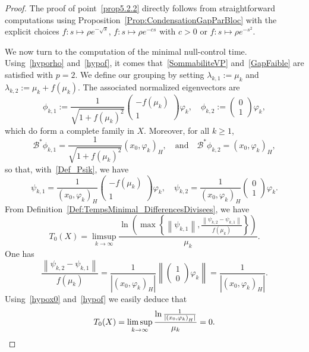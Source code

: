 \documentclass[AHL,Unicode,longabstracts]{cedram}
\newcommand\Bs{\mathcal{B}^*}
\newcommand{\normeX}[1]{\left\| #1 \right\|}
\newcommand{\psH}[2]{\left(#1, #2 \right)_H}
\begin{document}
\begin{proof}
The proof of point~\eqref{prop5.2.2} directly follows from straightforward computations using Proposition~\ref{Prop:CondensationGapParBloc} with the explicit choices $f : s \mapsto \rho e^{-\sqrt{s}}$, $ f : s \mapsto \rho e^{-cs}$ with $c >0$ or $f : s \mapsto \rho e^{-s^2}$.

We now turn to the computation of the minimal null-control time. Using~\eqref{hyporho} and~\eqref{hypof}, it comes that~\eqref{SommabiliteVP} and~\eqref{GapFaible} are satisfied with $p=2$. We define our grouping by setting $\lambda_{k,1}:=\mu_k$ and $\lambda_{k,2}:=\mu_k+f(\mu_k)$. The associated normalized eigenvectors are
\[
\phi_{k,1} := \frac{1}{\sqrt{1+f(\mu_k)^2}}
\begin{pmatrix} -f(\mu_k) \\ 1
\end{pmatrix} \varphi_k,
\quad
\phi_{k,2} :=
\begin{pmatrix} 0 \\ 1
\end{pmatrix} \varphi_k,
\]
which do form a complete family in $X$. Moreover, for all $k \geq 1$,
\[
\Bs \phi_{k,1}= \frac{1}{\sqrt{1+f(\mu_k)^2}} \psH{x_0}{\varphi_k},
\quad \text{and} \quad
\Bs \phi_{k,2}= \psH{x_0}{\varphi_k},
\]
so that, with~\eqref{Def_Psik}, we have
\[
\psi_{k,1} = \frac{1}{\psH{x_0}{\varphi_k}}
\begin{pmatrix} -f(\mu_k) \\ 1
\end{pmatrix} \varphi_k,
\quad
\psi_{k,2} = \frac{1}{\psH{x_0}{\varphi_k}}
\begin{pmatrix} 0 \\ 1
\end{pmatrix} \varphi_k.
\]
From Definition~\eqref{Def:TempsMinimal_DifferencesDivisees}, we have
\[
T_0(X) = \limsup_{k \to \infty}\frac{\ln \left(\max \left\{ \normeX{\psi_{k,1}}, \frac{ \normeX{\psi_{k,2}-\psi_{k,1}} }{f(\mu_k)} \right\}\right) }{\mu_k}.
\]
One has
\begin{equation}\label{ExemplesCompensation}
\frac{ \normeX{\psi_{k,2}-\psi_{k,1}} }{f(\mu_k)} = \frac{1}{| \psH{x_0}{\varphi_k} |} \normeX{
\begin{pmatrix} 1 \\ 0
\end{pmatrix} \varphi_k} = \frac{1}{| \psH{x_0}{\varphi_k} |}.
\end{equation}
Using~\eqref{hypox0} and~\eqref{hypof} we easily deduce that
\[
T_0(X) = \limsup_{k \to \infty}\frac{\ln \frac{1}{| \psH{x_0}{\varphi_k} |}}{\mu_k} = 0.\qedhere
\]
\end{proof}
\end{document}
